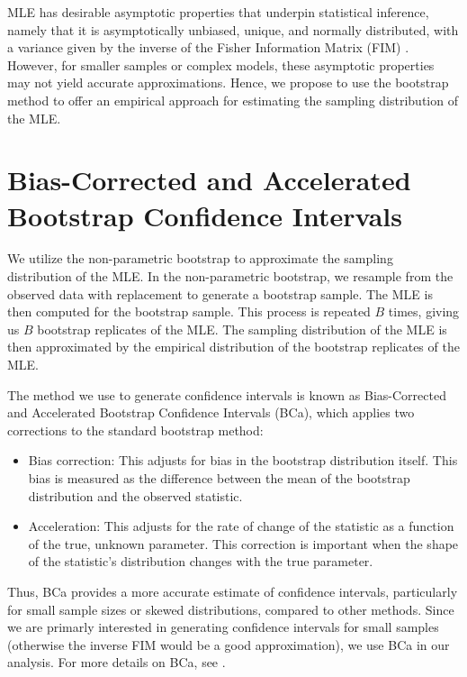 \documentclass[
]{article}
\begin{document}
MLE has desirable asymptotic properties that underpin statistical
inference, namely that it is asymptotically unbiased, unique, and
normally distributed, with a variance given by the inverse of the Fisher
Information Matrix (FIM) \citep{casella2002statistical}. However, for
smaller samples or complex models, these asymptotic properties may not
yield accurate approximations. Hence, we propose to use the bootstrap
method to offer an empirical approach for estimating the sampling
distribution of the MLE.

\hypertarget{sec:boot}{%
\section{Bias-Corrected and Accelerated Bootstrap Confidence
Intervals}\label{sec:boot}}

We utilize the non-parametric bootstrap to approximate the sampling
distribution of the MLE. In the non-parametric bootstrap, we resample
from the observed data with replacement to generate a bootstrap sample.
The MLE is then computed for the bootstrap sample. This process is
repeated \(B\) times, giving us \(B\) bootstrap replicates of the MLE.
The sampling distribution of the MLE is then approximated by the
empirical distribution of the bootstrap replicates of the MLE.

The method we use to generate confidence intervals is known as
Bias-Corrected and Accelerated Bootstrap Confidence Intervals (BCa),
which applies two corrections to the standard bootstrap method:

\begin{itemize}
\item
  Bias correction: This adjusts for bias in the bootstrap distribution
  itself. This bias is measured as the difference between the mean of
  the bootstrap distribution and the observed statistic.
\item
  Acceleration: This adjusts for the rate of change of the statistic as
  a function of the true, unknown parameter. This correction is
  important when the shape of the statistic's distribution changes with
  the true parameter.
\end{itemize}

Thus, BCa provides a more accurate estimate of confidence intervals,
particularly for small sample sizes or skewed distributions, compared to
other methods. Since we are primarly interested in generating confidence
intervals for small samples (otherwise the inverse FIM would be a good
approximation), we use BCa in our analysis. For more details on BCa, see
\citep{efron1987better}.
\end{document}
